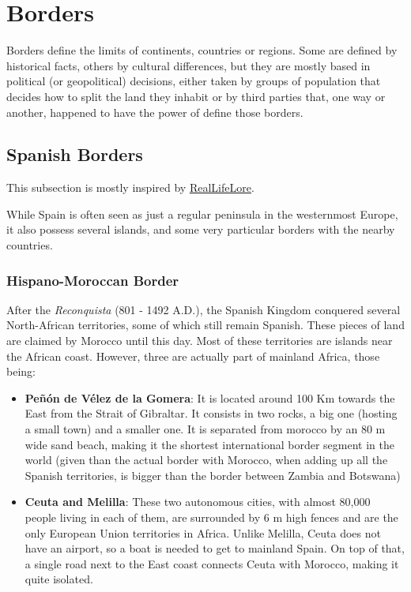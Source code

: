 \documentclass[../my_knowledge.tex]{subfiles}
\begin{document}
\section{Borders}
Borders define the limits of continents, countries or regions. Some are defined by historical facts, others by cultural differences, but they are mostly based in political (or geopolitical) decisions, either taken by groups of population that decides how to split the land they inhabit or by third parties that, one way or another, happened to have the power of define those borders.

\subsection{Spanish Borders}
This subsection is mostly inspired by \href{https://www.youtube.com/watch?v=L6tJ-mvhznU}{RealLifeLore}\cite{spanish_borders}.

While Spain is often seen as just a regular peninsula in the westernmost Europe, it also possess several islands, and some very particular borders with the nearby countries.

\subsubsection{Hispano-Moroccan Border}
\label{hispano_moroccan_border}
After the \textit{Reconquista} (801 - 1492 A.D.), the Spanish Kingdom conquered several North-African territories, some of which still remain Spanish. These pieces of land are claimed by Morocco until this day. Most of these territories are islands near the African coast. However, three are actually part of mainland Africa, those being:

\begin{itemize}
	\item \textbf{Pe\~n\'on de V\'elez de la Gomera}: It is located around 100 Km towards the East from the Strait of Gibraltar. It consists in two rocks, a big one (hosting a small town) and a smaller one. It is separated from morocco by an 80 m wide sand beach, making it the shortest international border segment in the world (given than the actual border with Morocco, when adding up all the Spanish territories, is bigger than the border between Zambia and Botswana\cite{shortest_borders})
	\item \textbf{Ceuta and Melilla}: These two autonomous cities, with almost 80,000 people living in each of them, are surrounded by 6 m high fences and are the only European Union territories in Africa. Unlike Melilla, Ceuta does not have an airport, so a boat is needed to get to mainland Spain. On top of that, a single road next to the East coast connects Ceuta with Morocco, making it quite isolated.
\end{itemize}
\end{document}
